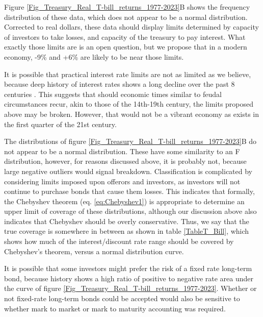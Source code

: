\documentclass{article}
\begin{document}
Figure \ref{Fig_Treasury_Real_T-bill_returns_1977-2023}B shows the frequency distribution of these data, which does not appear to be a normal distribution. Corrected to real dollars, these data should display limits determined by capacity of investors to take losses, and capacity of the treasury to pay interest. What exactly those limits are is an open question, but we propose that in a modern economy, -9\% and +6\% are likely to be near those limits. 

It is possible that practical interest rate limits are not as limited as we believe, because deep  history of interest rates shows a long decline over the past 8 centuries \cite{Schmelzing2020_8CenturiesOfGlobalRealInterestRates}. This suggests that should economic times similar to feudal circumstances recur, akin to those of the 14th-19th century, the limits proposed above may be broken. However, that would not be a vibrant economy as exists in the first quarter of the 21st century. 

The distributions  of figure \ref{Fig_Treasury_Real_T-bill_returns_1977-2023}B do not appear to be a normal distribution. These have some similarity to an F distribution, however, for reasons discussed above, it is probably not, because large negative outliers would signal breakdown. Classification is complicated by considering limits imposed upon offerors and investors, as investors will not continue to purchase bonds that cause them losses. This indicates that formally, the Chebyshev theorem (eq. \ref{eq:Chebyshev1}) is appropriate to determine an upper limit of coverage of these distributions, although our discussion above also indicates that Chebyshev should be overly conservative. Thus, we say that the true coverage is somewhere in between as shown in table \ref{TableT_Bill}, which shows how much of the interest/discount rate range should be covered by Chebyshev's theorem, versus a normal distribution curve.

It is possible that some investors might prefer the risk of a fixed rate long-term bond, because history shows a high ratio of positive to negative rate area under the curve of figure \ref{Fig_Treasury_Real_T-bill_returns_1977-2023}. Whether or not fixed-rate long-term bonds could be accepted would also be sensitive to whether mark to market or mark to maturity accounting was required. 
\end{document}
